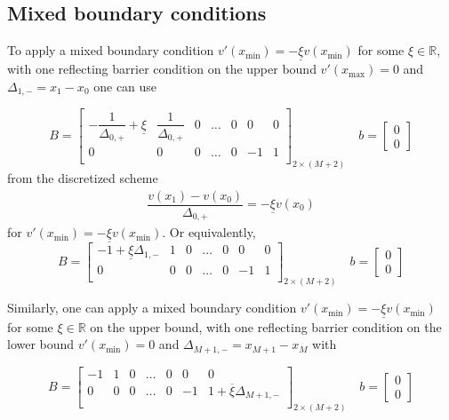 \documentclass[11pt]{article}
\theoremstyle{definition}
\begin{document}
\subsection{Mixed boundary conditions}

To apply a mixed boundary condition $v'(x_{\min}) = - \underline{\xi} v(x_{\min}) $ for some $\xi \in \mathbb{R}$, with one reflecting barrier condition on the upper bound $v'(x_{\max}) = 0$ and $\Delta_{1,-} = x_1 - x_0$ one can use

\begin{equation}\label{eq:mixed-barrier-matrix-original}
B = \begin{bmatrix}
-\dfrac{1}{\Delta_{0,+}} + \underline{\xi} & \dfrac{1}{\Delta_{0,+}} & 0 & \dots & 0 & 0 & 0 \\
0 & 0 & 0 & \dots & 0 & -1 & 1\\
\end{bmatrix}_{2 \times (M+2)} \quad 
b = \begin{bmatrix}
0 \\
0
\end{bmatrix}
\end{equation}
from the discretized scheme
\begin{align}
\dfrac{v(x_1) - v(x_0)}{\Delta_{0,+}} = - \underline{\xi} v(x_0)
\end{align}
for $v'(x_{\min}) = - \underline{\xi} v(x_{\min})$. Or equivalently,
\begin{equation}\label{eq:mixed-barrier-matrix}
B = \begin{bmatrix}
-1 +  \underline{\xi} \Delta_{1,-} & 1 & 0 & \dots & 0 & 0 & 0 \\
0 & 0 & 0 & \dots & 0 & -1 & 1\\
\end{bmatrix}_{2 \times (M+2)} \quad 
b = \begin{bmatrix}
0 \\
0
\end{bmatrix}
\end{equation}

Similarly, one can apply a mixed boundary condition $v'(x_{\min}) = - \underline{\xi} v(x_{\min}) $ for some $\xi \in \mathbb{R}$ on the upper bound, with one reflecting barrier condition on the lower bound $v'(x_{\min}) = 0$ and $\Delta_{M+1,-} = x_{M+1} - x_M$ with


\begin{equation}\label{eq:mixed-barrier-matrix-ub}
B = \begin{bmatrix}
-1 & 1 & 0 & \dots & 0 & 0 & 0 \\
0 & 0 & 0 & \dots & 0 & -1 & 1 + \overline{\xi} \Delta_{M+1,-}   \\
\end{bmatrix}_{2 \times (M+2)} \quad 
b = \begin{bmatrix}
0 \\
0
\end{bmatrix}
\end{equation}
\end{document}

